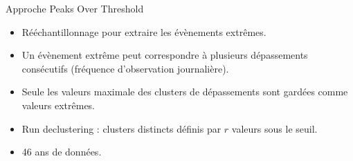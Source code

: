 \documentclass[aspectratio=169]{beamer}
\begin{document}
\begin{frame}{Approche Peaks Over Threshold}
\begin{itemize}
	\setlength{\itemsep}{17pt}
	\item Rééchantillonnage pour extraire les évènements extrêmes.
	\item Un évènement extrême peut correspondre à plusieurs dépassements consécutifs (fréquence d'observation journalière).
	\item Seule les valeurs maximale des clusters de dépassements sont gardées comme valeurs extrêmes.
	\item Run declustering : clusters distincts définis par $r$ valeurs sous le seuil.
	\item 46 ans de données.
\end{itemize}
\end{frame}
\end{document}
